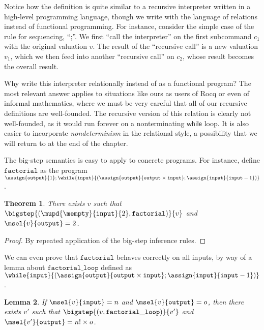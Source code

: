 \documentclass{amsbook}
\newtheorem{theorem}{Theorem}[chapter]
\newtheorem{lemma}[theorem]{Lemma}
\theoremstyle{definition}
\theoremstyle{remark}
\numberwithin{section}{chapter}
\numberwithin{equation}{chapter}
\begin{document}
Notice how the definition is quite similar to a recursive interpreter written in a high-level programming language, though we write with the language of relations instead of functional programming.
For instance, consider the simple case of the rule for sequencing, ``;''.
We first ``call the interpreter'' on the first subcommand $c_1$ with the original valuation $v$.
The result of the ``recursive call'' is a new valuation $v_1$, which we then feed into another ``recursive call'' on $c_2$, whose result becomes the overall result.

Why write this interpreter relationally instead of as a functional program?
The most relevant answer applies to situations like ours as users of Rocq or even of informal mathematics, where we must be very careful that all of our recursive definitions are well-founded.
The recursive version of this relation is clearly not well-founded, as it would run forever on a nonterminating $\mathsf{while}$ loop.
It is also easier to incorporate \emph{nondeterminism} in the relational style, a possibility that we will return to at the end of the chapter.

The big-step semantics is easy to apply to concrete programs.
For instance, define $\mathtt{factorial}$ as the program $\assign{\mathtt{output}}{1}; \while{\mathtt{input}}{(\assign{\mathtt{output}}{\mathtt{output} \times \mathtt{input}}; \assign{\mathtt{input}}{\mathtt{input} - 1})}$.

\begin{theorem}
  There exists $v$ such that $\bigstep{(\mupd{\mempty}{\mathtt{input}}{2}, \mathtt{factorial})}{v}$ and $\msel{v}{\mathtt{output}} = 2$.
\end{theorem}

\begin{proof}
  By repeated application of the big-step inference rules.
\end{proof}

We can even prove that $\mathtt{factorial}$ behaves correctly on all inputs, by way of a lemma about $\mathtt{factorial\_loop}$ defined as $\while{\mathtt{input}}{(\assign{\mathtt{output}}{\mathtt{output} \times \mathtt{input}}; \assign{\mathtt{input}}{\mathtt{input} - 1})}$.

\begin{lemma}\label{factorial_loop}
  If $\msel{v}{\mathtt{input}} = n$ and $\msel{v}{\mathtt{output}} = o$, then there exists $v'$ such that $\bigstep{(v, \mathtt{factorial\_loop})}{v'}$ and $\msel{v'}{\mathtt{output}} = n! \times o$.
\end{lemma}
\end{document}
